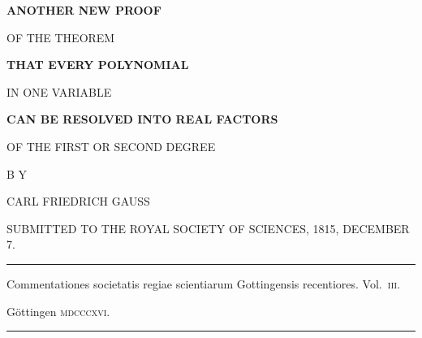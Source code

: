 \thispagestyle{empty}
\begin{center}
\vspace*{.25in}
{\large\bfseries ANOTHER NEW PROOF}\par
\vspace{.18in}
OF THE THEOREM\par
\vspace{.35in}
{\Large\bfseries THAT EVERY POLYNOMIAL\par
\medskip }\par
\vspace{.25in}
IN ONE VARIABLE\par
\vspace{.25in}
{\bfseries CAN BE RESOLVED INTO REAL FACTORS}\par
\vspace{.25in}
OF THE FIRST OR SECOND DEGREE\par
\vspace{.6in}
B Y\par
\vspace{.3in}
{\large CARL FRIEDRICH GAUSS}\par
\vspace{.35in}
SUBMITTED TO THE ROYAL SOCIETY OF SCIENCES, 1815, DECEMBER 7.\par
\vspace{.65in}
\rule{.88\linewidth}{.3pt}\par
\medskip
{\small Commentationes societatis regiae scientiarum Gottingensis recentiores. Vol.~\textsc{iii}.\par}
\medskip
Göttingen \textsc{mdcccxvi}.\par
\medskip
\rule{.88\linewidth}{.3pt}
\end{center}
\clearpage
